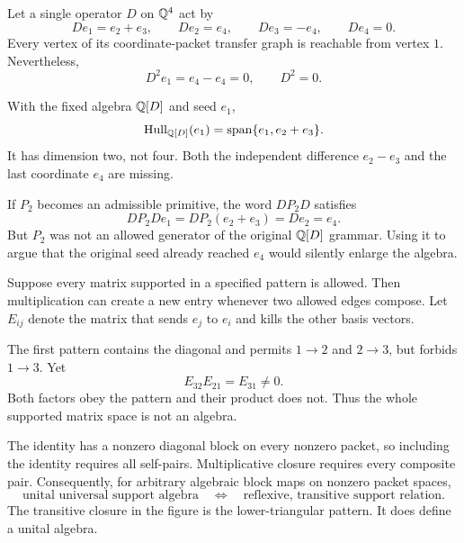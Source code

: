 Let a single operator $D$ on $\mathbb Q^4$ act by
\[
De_1=e_2+e_3,\qquad De_2=e_4,\qquad De_3=-e_4,\qquad De_4=0.
\]
Every vertex of its coordinate-packet transfer graph is reachable from vertex $1$. Nevertheless,
\[
D^2e_1=e_4-e_4=0,\qquad D^2=0.
\]


With the fixed algebra $\mathbb Q[D]$ and seed $e_1$,
\[
\operatorname{Hull}_{\mathbb Q[D]}(e_1)=\operatorname{span}\{e_1,e_2+e_3\}.
\]
It has dimension two, not four. Both the independent difference $e_2-e_3$ and the last coordinate $e_4$ are missing.

If $P_2$ becomes an admissible primitive, the word $DP_2D$ satisfies
\[
DP_2De_1=DP_2(e_2+e_3)=De_2=e_4.
\]
But $P_2$ was not an allowed generator of the original $\mathbb Q[D]$ grammar. Using it to argue that the original seed already reached $e_4$ would silently enlarge the algebra.


Suppose every matrix supported in a specified pattern is allowed. Then multiplication can create a new entry whenever two allowed edges compose. Let $E_{ij}$ denote the matrix that sends $e_j$ to $e_i$ and kills the other basis vectors.


The first pattern contains the diagonal and permits $1\to2$ and $2\to3$, but forbids $1\to3$. Yet
\[
E_{32}E_{21}=E_{31}\ne0.
\]
Both factors obey the pattern and their product does not. Thus the whole supported matrix space is not an algebra.

The identity has a nonzero diagonal block on every nonzero packet, so including the identity requires all self-pairs. Multiplicative closure requires every composite pair. Consequently, for arbitrary algebraic block maps on nonzero packet spaces,
\[
\boxed{\text{unital universal support algebra}
\quad\Longleftrightarrow\quad
\text{reflexive, transitive support relation}.}
\]
The transitive closure in the figure is the lower-triangular pattern. It does define a unital algebra.


